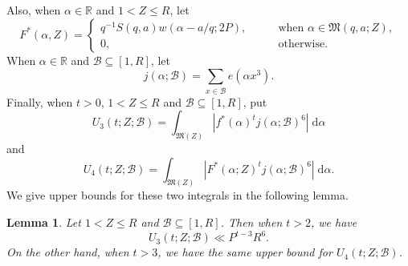 \documentclass[12pt,english,reqno]{amsart}
\theoremstyle{definition}
\theoremstyle{remark}
\numberwithin{equation}{section}
\numberwithin{equation}{section}
\numberwithin{figure}{section}
\theoremstyle{plain}
\theoremstyle{plain}
\theoremstyle{plain}
\newtheorem{lem}[thm]{Lemma}
\theoremstyle{plain}
\numberwithin{equation}{section}
\numberwithin{thm}{section}
\begin{document}
Also, when $\alpha\in\mathbb{R}$ and $1<Z\leq R$, let
\begin{equation}
F^*(\alpha,Z)=\begin{cases}
q^{-1}S(q,a)w(\alpha-a/q;2P),\qquad & \text{when }\alpha\in\mathfrak{M}(q,a;Z),\\
0,\qquad & \text{otherwise.}\end{cases}\label{eq:F*}\end{equation}
When $\alpha\in\mathbb{R}$ and $\mathcal{B}\subseteq[1,R]$, let
\begin{equation}
j(\alpha;\mathcal{B})=\sum_{x\in\mathcal{B}}e(\alpha x^3).\label{eq:j(alpha)}\end{equation}
Finally, when $t>0$, $1<Z\leq R$ and $\mathcal{B}\subseteq[1,R]$, put
\begin{equation} U_3(t;Z;\mathcal{B})=\int_{\mathfrak{M}(Z)}|f^*(\alpha)^tj(\alpha;\mathcal{B})^6|\;\mathrm{d}\alpha\label{eq:U_3}\end{equation}
and
\begin{equation} U_4(t;Z;\mathcal{B})=\int_{\mathfrak{M}(Z)}|F^*(\alpha;Z)^{t}j(\alpha;\mathcal{B})^6|\;\mathrm{d}\alpha.\label{eq:U_4}\end{equation}
We give upper bounds for these two integrals in the following lemma.
\begin{lem}
\label{lem:mean of f*^vh^6}Let $1<Z\leq R$ and $\mathcal{B}\subseteq[1,R]$. Then when $t>2$, we have
\[ U_3(t;Z;\mathcal{B})\ll P^{t-3}R^6.\]
On the other hand, when $t>3$, we have the same upper bound for $U_4(t;Z;\mathcal{B})$.
\end{lem}
\end{document}
